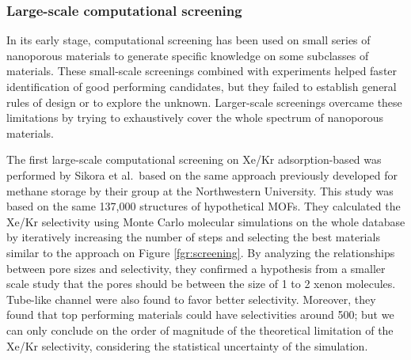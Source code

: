\documentclass[main.tex]{subfiles}
\begin{document}
\subsubsection{Large-scale computational screening}

In its early stage, computational screening has been used on small series of nanoporous materials to generate specific knowledge on some subclasses of materials. These small-scale screenings combined with experiments helped faster identification of good performing candidates, but they failed to establish general rules of design or to explore the unknown. Larger-scale screenings overcame these limitations by trying to exhaustively cover the whole spectrum of nanoporous materials.

The first large-scale computational screening on Xe/Kr adsorption-based was performed by Sikora et al.\ based on the same approach previously developed for methane storage by their group at the Northwestern University.\cite{Sikora_2012} This study was based on the same {137,000} structures of hypothetical MOFs.\cite{Wilmer_2012} They calculated the Xe/Kr selectivity using Monte Carlo molecular simulations on the whole database by iteratively increasing the number of steps and selecting the best materials similar to the approach on Figure \ref{fgr:screening}. By analyzing the relationships between pore sizes and selectivity, they confirmed a hypothesis from a smaller scale study that the pores should be between the size of 1 to 2 xenon molecules.\cite{Ryan_2010} Tube-like channel were also found to favor better selectivity. Moreover, they found that top performing materials could have selectivities around 500; but we can only conclude on the order of magnitude of the theoretical limitation of the Xe/Kr selectivity, considering the statistical uncertainty of the simulation.
\end{document}
